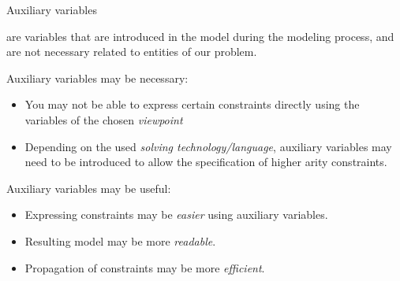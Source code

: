 \documentclass{cons-beamer}
\begin{document}
\begin{frame}{Auxiliary variables}
  \begin{definition}
     are variables that are introduced in the model during the modeling process, and are not necessary related to entities of our problem.
  \end{definition}
  \vfill

  Auxiliary variables may be necessary:
  \begin{itemize}
    \item You may not be able to express certain constraints directly using the variables of the chosen \textit{viewpoint}
    \item Depending on the used \textit{solving technology/language}, auxiliary variables may need to be introduced to allow the specification of higher arity constraints.
  \end{itemize}
  \vfill

  Auxiliary variables may be useful:
  \begin{itemize}
    \item Expressing constraints may be \textit{easier} using auxiliary variables.
    \item Resulting model may be more \textit{readable}.
    \item Propagation of constraints may be more \textit{efficient}.
  \end{itemize}
\end{frame}
\end{document}
